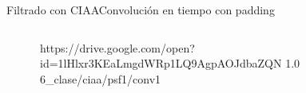 \begin{frame}[t]{Filtrado con CIAA}{Convolución en tiempo con padding}
   \protoboardicon
   \begin{columns}[c]
      \hspace{5pt}
      \begin{column}{.3\textwidth}
         
      \end{column}
      \hspace{2pt}
      \vrule
      \hspace{2pt}
      \begin{column}{.3\textwidth}
         
      \end{column}
      \hspace{2pt}
      \vrule
      \hspace{2pt}
      \begin{column}{.4\textwidth}
         {https://drive.google.com/open?id=1lHlxr3KEaLmgdWRp1LQ9AgpAOJdbaZQN}
         {1.0}
         {6_clase/ciaa/psf1/conv1}
      \end{column}
      \hspace{2pt}
   \end{columns}
   \vfill
\end{frame}
